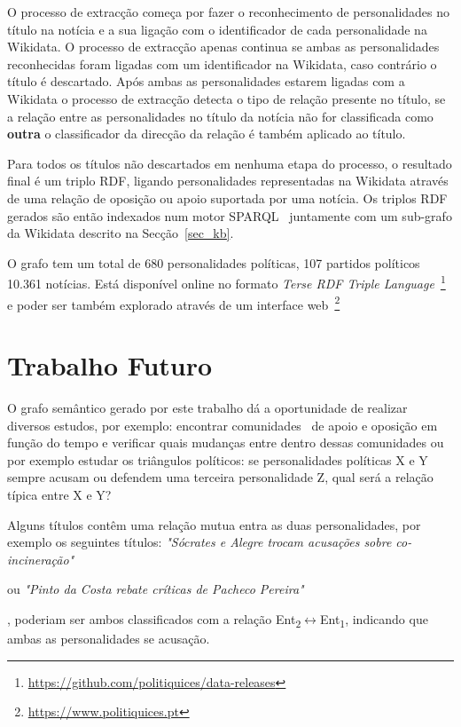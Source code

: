 \documentclass[a4paper, twocolumn, 11pt, twoside]{article}
\begin{document}
{{O processo de extracção começa por fazer o reconhecimento de personalidades no título na notícia e a sua ligação com o identificador de cada personalidade na Wikidata. O processo de extracção apenas continua se ambas as personalidades reconhecidas foram ligadas com um identificador na Wikidata, caso contrário o título é descartado.  Após ambas as personalidades estarem ligadas com a Wikidata o processo de extracção detecta o tipo de relação presente no título, se a relação entre as personalidades no título da notícia não for classificada como \textbf{outra} o classificador da direcção da relação é também aplicado ao título. 

Para todos os títulos não descartados em nenhuma etapa do processo, o resultado final é um triplo RDF, ligando personalidades representadas na Wikidata através de uma relação de oposição ou apoio suportada por uma notícia. Os triplos RDF gerados são então indexados num motor SPARQL~\citep{jena2015free} juntamente com um sub-grafo da Wikidata descrito na Secção~\ref{sec_kb}.

O grafo tem um total de 680 personalidades políticas, 107 partidos políticos 10.361 notícias. Está disponível online no formato \textit{Terse RDF Triple Language}~\footnote{\url{https://github.com/politiquices/data-releases}} e poder ser também explorado através de um interface web~\footnote{\url{https://www.politiquices.pt}}

\section{Trabalho Futuro}
\label{sec:future_work}

O grafo semântico gerado por este trabalho dá a oportunidade de realizar diversos estudos, por exemplo: encontrar comunidades~\cite{} de apoio e oposição em função do tempo e verificar quais mudanças entre dentro dessas comunidades ou por exemplo estudar os triângulos políticos: se personalidades políticas X e Y sempre acusam ou defendem uma terceira personalidade Z, qual será a relação típica entre X e Y?


Alguns títulos contêm uma relação mutua entra as duas personalidades, por exemplo os seguintes títulos: \textit{"Sócrates e Alegre trocam acusações sobre co-incineração"}} ou \textit{"Pinto da Costa rebate críticas de Pacheco Pereira"}}, poderiam ser ambos classificados com a relação Ent\textsubscript{2}$\leftrightarrow$Ent\textsubscript{1}, indicando que ambas as personalidades se acusação. 
\end{document}
